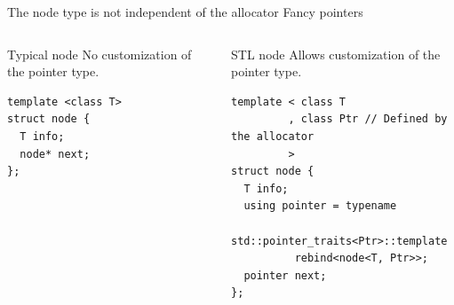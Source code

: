 \documentclass[10pt,aspectratio=169]{beamer}
\begin{document}
\begin{frame}[fragile]
{The node type is not independent of the allocator}
{Fancy pointers}

\begin{columns}
\begin{column}[t]{0.47\textwidth}
\begin{block}{Typical node}
No customization of the pointer type.
\end{block}
\begin{lstlisting}
template <class T>
struct node {
  T info;
  node* next;
};
\end{lstlisting}
\end{column}
\begin{column}[t]{0.47\textwidth}
\begin{block}{STL node}
Allows customization of the pointer type.
\end{block}
\begin{lstlisting}
template < class T
         , class Ptr // Defined by the allocator
         >
struct node {
  T info;
  using pointer = typename
      std::pointer_traits<Ptr>::template
          rebind<node<T, Ptr>>;
  pointer next;
};
\end{lstlisting}
\end{column}
\end{columns}
\end{frame}
\end{document}
